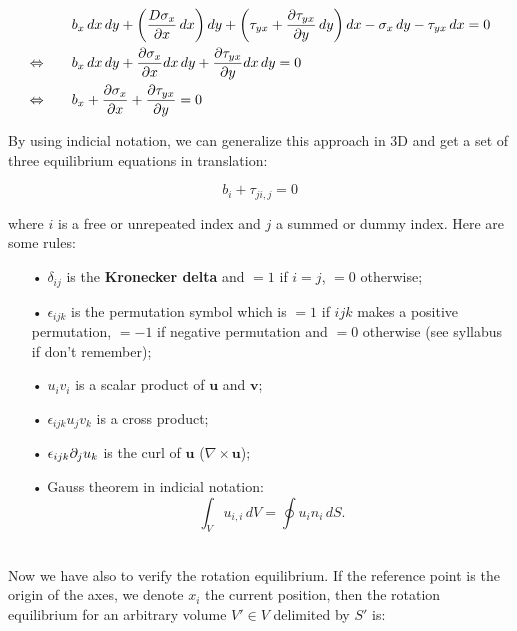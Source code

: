 		\begin{equation}
		\begin{aligned}
		&b_x\, dx\, dy + \left(\frac{D\sigma _x}{\partial x}\, dx\right) dy + \left( \tau _{yx} + \frac{\partial \tau _{yx}}{\partial y}\, dy \right) dx- \sigma _x \, dy - \tau _{yx}\, dx=0\\
		\Leftrightarrow \qquad &b_x \,dx \, dy + \frac{\partial \sigma_x}{\partial x}dx\, dy + \frac{\partial \tau _{yx}}{\partial y} dx \, dy =0\\
		\Leftrightarrow \qquad &b_x + \frac{\partial \sigma_x}{\partial x} + \frac{\partial \tau _{yx}}{\partial y} =0
		\end{aligned}
		\end{equation}
		
		By using indicial notation, we can generalize this approach in 3D and get a set of three equilibrium equations in translation:
		
		\begin{equation}
		b_i + \tau _{ji,j} = 0
		\end{equation}
		
		where $i$ is a free or unrepeated index and $j$ a summed or dummy index. Here are some rules:
		
		\begin{itemize}
			\item[•] $\delta_{ij}$ is the \textbf{Kronecker delta} and $=1$ if $i=j$, $=0$ otherwise;
			
			\item[•] $\epsilon _{ijk}$ is the permutation symbol which is $=1$ if $ijk$ makes a positive permutation, $=-1$ if negative permutation and $=0$ otherwise (see syllabus if don't remember);
			
			\item[•] $u_iv_i$ is a scalar product of $\bm{u}$ and $\bm{v}$;
			\item[•] $\epsilon _{ijk} u_jv_k$ is a cross product;
			\item[•] $\epsilon _{ijk} \partial _j u_k$ is the curl of $\bm{u}$ ($\nabla \times \bm{u}$);
			\item[•] Gauss theorem in indicial notation:
			\begin{equation}
			\int _V u_{i,i}\, dV = \oint u_i n_i \, dS.
			\end{equation}
\end{itemize}		 

			\ \\ Now we have also to verify the rotation equilibrium. If the reference point is the origin of the axes, we denote $x_i$ the current position, then the rotation equilibrium for an arbitrary volume $V' \in V$ delimited by $S'$ is:
			
